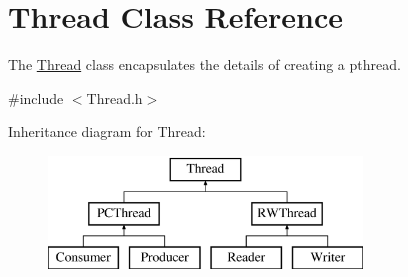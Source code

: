 \hypertarget{class_thread}{}\section{Thread Class Reference}
\label{class_thread}


The \hyperlink{class_thread}{Thread} class encapsulates the details of creating a pthread.  




{\ttfamily \#include $<$Thread.\+h$>$}

Inheritance diagram for Thread\+:\begin{figure}[H]
\begin{center}
\leavevmode
\includegraphics[height=3.000000cm]{class_thread}
\end{center}
\end{figure}
